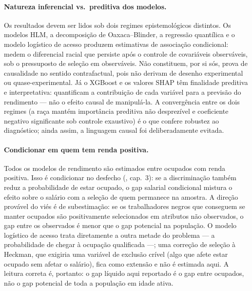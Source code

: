 \documentclass[11pt, a4paper, oneside]{article}
\begin{document}
\paragraph{Natureza inferencial {vs.}\ preditiva dos modelos.}
Os resultados devem ser lidos sob dois regimes epistemológicos distintos.
Os modelos HLM, a decomposição de Oaxaca--Blinder, a regressão quantílica e
o modelo logístico de acesso produzem {estimativas de associação condicional}:
medem o diferencial racial que persiste após o controle de covariáveis
observáveis, sob o pressuposto de seleção em observáveis. Não constituem, por
si sós, prova de causalidade no sentido contrafactual, pois não derivam de
desenho experimental ou quase-experimental. Já o XGBoost e os valores SHAP têm
finalidade {preditiva e interpretativa}: quantificam a contribuição de
cada variável para a {previsão} do rendimento --- não o efeito causal
de manipulá-la. A convergência entre os dois regimes (a raça mantém importância
preditiva não desprezível {e} coeficiente negativo significante sob
controle exaustivo) é o que confere robustez ao diagnóstico; ainda assim, a
linguagem causal foi deliberadamente evitada.

\paragraph{Condicionar em quem tem renda positiva.}
Todos os modelos de rendimento são estimados entre ocupados com renda positiva. Isso é
{condicionar no desfecho} (, cap.~3): se a discriminação
também reduz a probabilidade de estar ocupado, o gap salarial condicional mistura o
efeito sobre o salário com a seleção de quem permanece na amostra. A direção provável do
viés é de {subestimação}: se os trabalhadores negros que conseguem se manter
ocupados são positivamente selecionados em atributos não observados, o gap entre os
observados é menor que o gap potencial na população. O modelo logístico de acesso trata
diretamente a outra metade do problema --- a probabilidade de chegar à ocupação
qualificada ---; uma correção de seleção à Heckman, que exigiria uma variável de
exclusão crível (algo que afete estar ocupado sem afetar o salário), fica como extensão
e não é estimada aqui. A leitura correta é, portanto: o gap líquido aqui reportado
é o gap {entre ocupados}, não o gap potencial de toda a população em idade ativa.
\end{document}
